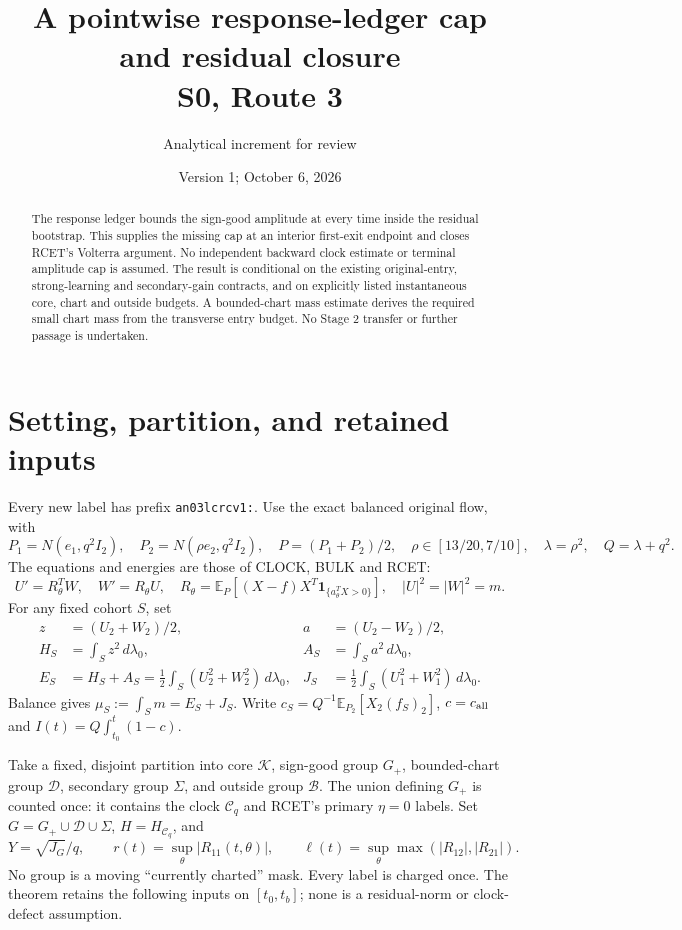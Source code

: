 \documentclass[11pt]{article}
\title{A pointwise response-ledger cap and residual closure\\S0, Route 3}
\author{Analytical increment for review}
\date{Version 1; October 6, 2026}
\theoremstyle{remark}\newtheorem{remark}[theorem]{Remark}
\newcommand{\E}{\mathbb E}
\newcommand{\dd}{\,d}
\newcommand{\one}{\mathbf1}
\newcommand{\Gp}{G_+}
\newcommand{\Cl}{\mathcal C_q}
\begin{document}
\maketitle
\begin{abstract}
The response ledger bounds the sign-good amplitude at every time
inside the residual bootstrap. This supplies the missing cap at an
interior first-exit endpoint and closes RCET's Volterra argument.
No independent backward clock estimate or terminal amplitude cap is
assumed. The result is conditional on the existing original-entry,
strong-learning and secondary-gain contracts, and on explicitly
listed instantaneous core, chart and outside budgets. A bounded-chart
mass estimate derives the required small chart mass from the transverse
entry budget. No Stage 2 transfer or further passage is undertaken.
\end{abstract}

\section{Setting, partition, and retained inputs}
Every new label has prefix \texttt{an03lcrcv1:}.
Use the exact balanced original flow, with
\[
 P_1=N(e_1,q^2I_2),\quad P_2=N(\rho e_2,q^2I_2),\quad
 P=(P_1+P_2)/2,\quad \rho\in[13/20,7/10],\quad
 \lambda=\rho^2,\quad Q=\lambda+q^2.
\]
The equations and energies are those of CLOCK, BULK and RCET:
\[
 U'=R_\theta^TW,\quad W'=R_\theta U,\quad
 R_\theta=\E_P[(X-f)X^T\one_{\{a_\theta^TX>0\}}],\quad
 |U|^2=|W|^2=m.
\]
For any fixed cohort $S$, set
\begin{align*}
 z&=(U_2+W_2)/2, & a&=(U_2-W_2)/2,\\
 H_S&=\int_Sz^2\dd\lambda_0, & A_S&=\int_Sa^2\dd\lambda_0,\\
 E_S&=H_S+A_S=\tfrac12\int_S(U_2^2+W_2^2)\dd\lambda_0,
 &J_S&=\tfrac12\int_S(U_1^2+W_1^2)\dd\lambda_0.
\end{align*}
Balance gives $\mu_S:=\int_Sm=E_S+J_S$.
Write $c_S=Q^{-1}\E_{P_2}[X_2(f_S)_2]$, $c=c_{\rm all}$ and
$I(t)=Q\int_{t_0}^t(1-c)$.

Take a fixed, disjoint partition into core $\mathcal K$, sign-good
group $\Gp$, bounded-chart group $\mathcal D$, secondary group
$\Sigma$, and outside group $\mathcal B$.
The union defining $\Gp$ is counted once: it contains the clock
$\Cl$ and RCET's primary $\eta=0$ labels.
Set $G=\Gp\cup\mathcal D\cup\Sigma$, $H=H_{\Cl}$, and
\[
 Y=\sqrt{J_G}/q,\qquad
 r(t)=\sup_\theta|R_{11}(t,\theta)|,\qquad
 \ell(t)=\sup_\theta\max(|R_{12}|,|R_{21}|).
\]
No group is a moving ``currently charted'' mask. Every label is
charged once. The theorem retains the following inputs on
$[t_0,t_b]$; none is a residual-norm or clock-defect assumption.
\end{document}

